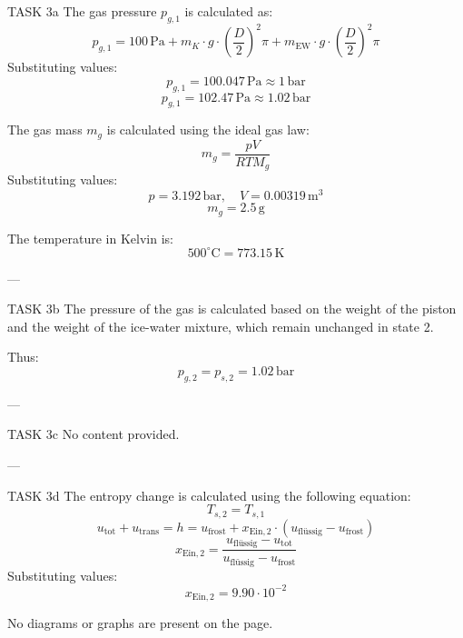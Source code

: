 TASK 3a  
The gas pressure \( p_{g,1} \) is calculated as:  
\[
p_{g,1} = 100 \, \text{Pa} + m_K \cdot g \cdot \left( \frac{D}{2} \right)^2 \pi + m_{\text{EW}} \cdot g \cdot \left( \frac{D}{2} \right)^2 \pi
\]  
Substituting values:  
\[
p_{g,1} = 100.047 \, \text{Pa} \approx 1 \, \text{bar}
\]  
\[
p_{g,1} = 102.47 \, \text{Pa} \approx 1.02 \, \text{bar}
\]  

The gas mass \( m_g \) is calculated using the ideal gas law:  
\[
m_g = \frac{p V}{R T M_g}
\]  
Substituting values:  
\[
p = 3.192 \, \text{bar}, \quad V = 0.00319 \, \text{m}^3
\]  
\[
m_g = 2.5 \, \text{g}
\]  

The temperature in Kelvin is:  
\[
500^\circ\text{C} = 773.15 \, \text{K}
\]  

---

TASK 3b  
The pressure of the gas is calculated based on the weight of the piston and the weight of the ice-water mixture, which remain unchanged in state 2.  

Thus:  
\[
p_{g,2} = p_{s,2} = 1.02 \, \text{bar}
\]  

---

TASK 3c  
No content provided.  

---

TASK 3d  
The entropy change is calculated using the following equation:  
\[
T_{s,2} = T_{s,1}
\]  
\[
u_{\text{tot}} + u_{\text{trans}} = h = u_{\text{frost}} + x_{\text{Ein},2} \cdot (u_{\text{flüssig}} - u_{\text{frost}})
\]  
\[
x_{\text{Ein},2} = \frac{u_{\text{flüssig}} - u_{\text{tot}}}{u_{\text{flüssig}} - u_{\text{frost}}}
\]  
Substituting values:  
\[
x_{\text{Ein},2} = 9.90 \cdot 10^{-2}
\]  

No diagrams or graphs are present on the page.